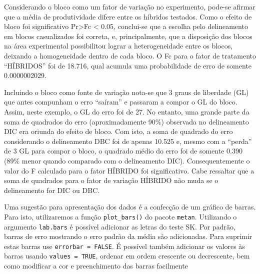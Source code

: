 \documentclass[
]{book}
\begin{document}

Considerando o bloco como um fator de variação no experimento, pode-se afirmar que a média de produtividade difere entre os híbridos testados. Como o efeito de bloco foi significativo Pr\textgreater Fc \textless{} 0.05, conclui-se que a escolha pelo delineamento em blocos casualizados foi correta, e, principalmente, que a disposição dos blocos na área experimental possibilitou lograr a heterogeneidade entre os blocos, deixando a homogeneidade dentro de cada bloco. O Fc para o fator de tratamento ``HÍBRIDOS'' foi de 18.716, qual acumula uma probabilidade de erro de somente 0.0000002029.

Incluindo o bloco como fonte de variação nota-se que 3 graus de liberdade (GL) que antes compunham o erro ``saíram'' e passaram a compor o GL do bloco. Assim, neste exemplo, o GL do erro foi de 27. No entanto, uma grande parte da soma de quadrados do erro (aproximadamente 90\%) observada no delineamento DIC era oriunda do efeito de bloco. Com isto, a soma de quadrado do erro considerando o delineamento DBC foi de apenas 10.525 e, mesmo com a ``perda'' de 3 GL para compor o bloco, o quadrado médio do erro foi de somente 0.390 (89\% menor quando comparado com o delineamento DIC). Consequentemente o valor do F calculado para o fator HÍBRIDO foi significativo. Cabe ressaltar que a soma de quadrados para o fator de variação HÍBRIDO não muda se o delineamento for DIC ou DBC.

Uma sugestão para apresentação dos dados é a confecção de um gráfico de barras. Para isto, utilizaremos a função \texttt{plot\_bars()} do pacote \texttt{metan}. Utilizando o argumento \texttt{lab.bars} é possível adicionar as letras do teste SK. Por padrão, barras de erro mostrando o erro padrão da média são adicionadas. Para suprimir estas barras use \texttt{errorbar\ =\ FALSE}. É possível também adicionar os valores às barras usando \texttt{values\ =\ TRUE}, ordenar em ordem crescente ou decrescente, bem como modificar a cor e preenchimento das barras facilmente
\end{document}
